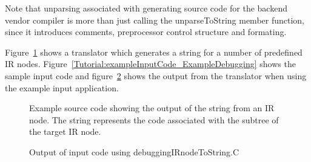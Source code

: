Note that unparsing associated with generating source code for the backend 
vendor compiler is more than just calling the unparseToString
member function, since it introduces comments, preprocessor control structure 
and formating.
    
Figure~\ref{Tutorial:exampleDebuggingIRNodeToString} shows a translator
which generates a string for a number of predefined IR nodes.  
Figure~\ref{Tutorial:exampleInputCode_ExampleDebugging} 
shows the sample input code and 
figure~\ref{Tutorial:exampleOutput_DebuggingIRNodeToString} 
shows the output from the translator when using the example input application.


\begin{figure}[!h]
{\indent
{\mySmallFontSize

\begin{latexonly}
   
\end{latexonly}

\begin{htmlonly}
   
\end{htmlonly}

}
}
\caption{Example source code showing the output of the string from an IR node. The string
         represents the code associated with the subtree of the target IR node.}
\label{Tutorial:exampleDebuggingIRNodeToString}
\end{figure}

\begin{figure}[!h]
{\indent
{\mySmallFontSize

\begin{latexonly}
   
\end{latexonly}

\begin{htmlonly}
   
\end{htmlonly}

}
}
\caption{Output of input code using debuggingIRnodeToString.C}
\label{Tutorial:exampleOutput_DebuggingIRNodeToString}
\end{figure}




